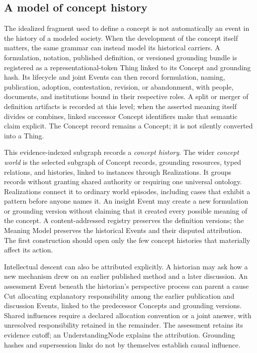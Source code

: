 \documentclass[11pt,a4paper]{article}
\begin{document}
\subsection{A model of concept history}

The idealized fragment used to define a concept is not automatically an event
in the history of a modeled society. When the development of the concept itself
matters, the same grammar can instead model its historical carriers. A
formulation, notation, published definition, or versioned grounding bundle is
registered as a representational-token Thing linked to its Concept and
grounding hash. Its lifecycle and joint Events can then record formulation,
naming, publication, adoption, contestation, revision, or abandonment, with
people, documents, and institutions bound in their respective roles. A split or
merger of definition artifacts is recorded at this level; when the asserted
meaning itself divides or combines, linked successor Concept identifiers make
that semantic claim explicit. The Concept record remains a Concept; it is not
silently converted into a Thing.

This evidence-indexed subgraph records a \emph{concept history}. The wider
\emph{concept world} is the selected subgraph of Concept records, grounding
resources, typed relations, and histories, linked to instances through
Realizations. It groups records without granting shared authority or requiring
one universal ontology. Realizations connect it to ordinary world episodes, including cases
that exhibit a pattern before anyone names it. An insight Event may create a
new formulation or grounding version without claiming that it created every
possible meaning of the concept. A content-addressed registry preserves the
definition versions; the Meaning Model preserves the historical Events and
their disputed attribution. The first construction should open only the few
concept histories that materially affect its action.

Intellectual descent can also be attributed explicitly. A historian may ask
how a new mechanism drew on an earlier published method and a later discussion.
An assessment Event beneath the historian's perspective process can parent a
cause Cut allocating explanatory responsibility among the earlier publication
and discussion Events, linked to the predecessor Concepts and grounding
versions. Shared influences require a declared allocation convention or a joint
answer, with unresolved responsibility retained in the remainder. The
assessment retains its evidence cutoff; an UnderstandingNode explains the
attribution. Grounding hashes and supersession links do not by themselves
establish causal influence.
\end{document}
